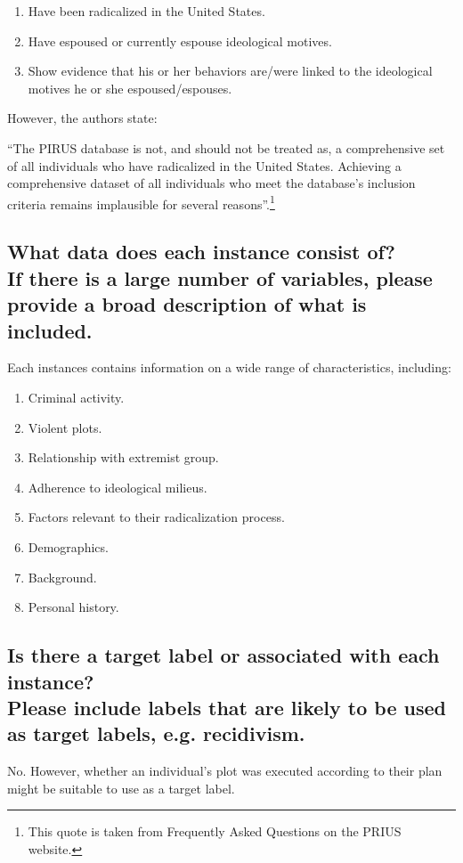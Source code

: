 \documentclass[letterpaper, 10 pt, conference]{ieeeconf}  %
\newcommand{\subtitle}[1]{{\\ \small \normalfont \color{purple} #1}}
\begin{document}
\begin{enumerate}
    \item Have been radicalized in the United States.
    \item Have espoused or currently espouse ideological motives.
    \item Show evidence that his or her behaviors are/were linked to the ideological motives he or she espoused/espouses. 
\end{enumerate}

However, the authors state:

``The PIRUS database is not, and should not be treated as, a comprehensive set of all individuals who have radicalized in the United States. Achieving a comprehensive dataset of all individuals who meet the database’s inclusion criteria remains implausible for several reasons''.\footnote{This quote is taken from Frequently Asked Questions on the PRIUS website.}

\subsection{What data does each instance consist of? \subtitle{If there is a large number of variables, please provide a broad description of what is included.}}

Each instances contains information on a wide range of characteristics, including:
\begin{enumerate}
    \item Criminal activity.
    \item Violent plots.
    \item Relationship with extremist group.
    \item Adherence to ideological milieus.
    \item Factors relevant to their radicalization process.
    \item Demographics.
    \item Background.
    \item Personal history.
\end{enumerate}

\subsection{Is there a target label or associated with each instance? \subtitle{Please include labels that are likely to be used as target labels, e.g. recidivism.}}

No. However, whether an individual's plot was executed according to their plan might be suitable to use as a target label.  
\end{document}
